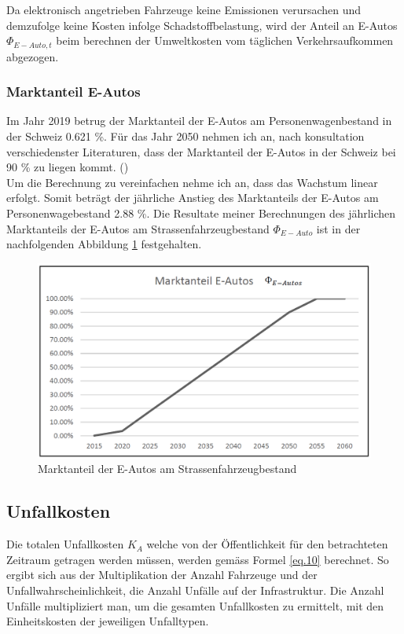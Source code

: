 Da elektronisch angetrieben Fahrzeuge keine Emissionen verursachen und demzufolge keine Kosten infolge Schadstoffbelastung, wird der Anteil an E-Autos \( \Phi_{E-Auto,t} \) beim berechnen der Umweltkosten vom täglichen Verkehrsaufkommen abgezogen.  



\newpage

\subsubsection*{Marktanteil E-Autos}
\label{subsubsec:Marktanteil}

Im Jahr 2019 betrug der Marktanteil der E-Autos am Personenwagenbestand in der Schweiz 0.621 \%. Für das Jahr 2050 nehmen ich an, nach konsultation verschiedenster Literaturen, dass der Marktanteil der E-Autos in der Schweiz bei 90 \% zu liegen kommt. (\cite{Bestand2019}) \\
Um die Berechnung zu vereinfachen nehme ich an, dass das Wachstum linear erfolgt. Somit beträgt der jährliche Anstieg des Marktanteils der E-Autos am Personenwagebestand 2.88 \%. Die Resultate meiner Berechnungen des jährlichen Marktanteils der E-Autos am Strassenfahrzeugbestand \( \Phi_{E-Auto} \) ist in der nachfolgenden Abbildung \ref{img:Marktanteil} festgehalten. 

\begin{figure}[h!]
	\centering
	\includegraphics[width=.6\textwidth]{figures/f-04-04-01-MarktanteilE-Auto}
	\caption[Marktanteil E-Autos]{Marktanteil der E-Autos am Strassenfahrzeugbestand}
	\label{img:Marktanteil}
\end{figure}

\pagebreak


\subsection*{Unfallkosten}
\label{subsec:Unfall}

Die totalen Unfallkosten $K_{A}$ welche von der Öffentlichkeit für den betrachteten Zeitraum getragen werden müssen, werden gemäss Formel \ref{eq.10} berechnet. So ergibt sich aus der Multiplikation der Anzahl Fahrzeuge und der Unfallwahrscheinlichkeit, die Anzahl Unfälle auf der Infrastruktur. Die Anzahl Unfälle multipliziert man, um die gesamten Unfallkosten zu ermittelt, mit den Einheitskosten der jeweiligen Unfalltypen.

